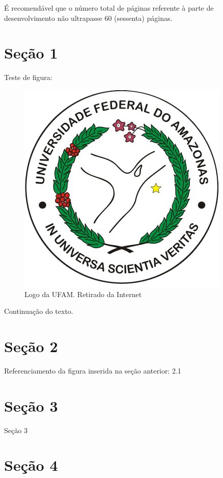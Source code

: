 \documentclass[
	12pt,			%
	openright,		%
	oneside,	
	a4paper,		%
	english,		%
	brazil			%
]{abntex2/abntex2}  %
\begin{document}
	É recomendável que o número total de páginas referente à parte de desenvolvimento não ultrapasse 60 (sessenta) páginas.

	\section{Seção 1}

		Teste de figura:

		\begin{figure}[h!]
			\begin{center}
			    \includegraphics[scale=0.5]{abntex2/ufam-logo}
			\end{center}
			\caption{\label{fig_grafico}Logo da UFAM. Retirado da Internet}
		\end{figure}
		
		Continuação do texto.
		
	\section{Seção 2}
	
		Referenciamento da figura inserida na seção anterior: 2.1
		
	\section{Seção 3}
	
		Seção 3
		
	\section{Seção 4}
	
\end{document}

